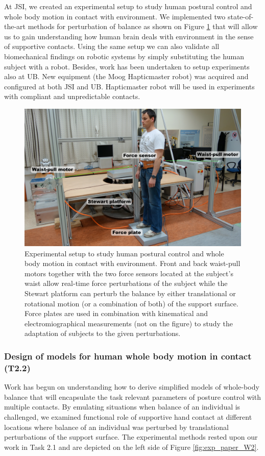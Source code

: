 \documentclass[12pt,a4paper,twoside]{article}
\begin{document}
At JSI, we created an experimental setup to study human postural control and whole body motion in contact with environment. We implemented two state-of-the-art methods for perturbation of balance as shown on Figure \ref{fig:exp_protocol_W2} that will allow us to gain understanding how human brain deals with environment in the sense of supportive contacts. Using the same setup we can also validate all biomechanical findings on robotic systems by simply substituting the human subject with a robot. Besides, work has been undertaken to setup experiments also at UB. New equipment (the Moog Hapticmaster robot) was acquired and configured at both JSI and UB. Hapticmaster robot will be used in experiments with compliant and unpredictable contacts.

\begin{figure}
\centering
\includegraphics[width=0.8\hsize]{images/exp_setup_WP2.png}
\caption{Experimental setup to study human postural control and whole body motion in contact with environment. Front and back waist-pull motors together with the two force sensors located at the subject's waist allow real-time force perturbations of the subject while the Stewart platform can perturb the balance by either translational or rotational motion (or a combination of both) of the support surface. Force plates are used in combination with kinematical and electromiographical measurements (not on the figure) to study the adaptation of subjects to the given perturbations.}
\label{fig:exp_protocol_W2}
\end{figure}

\subsubsection{Design of models for human whole body motion in contact (T2.2)}

Work has begun on understanding how to derive simplified models of whole-body balance that will encapsulate the task relevant parameters of posture control with multiple contacts. By emulating situations when balance of an individual is challenged, we examined functional role of supportive hand contact at different locations where balance of an individual was perturbed by translational perturbations of the support surface. The experimental methods rested upon our work in Task 2.1 and are depicted on the left side of Figure \ref{fig:exp_paper_W2}.
\end{document}
